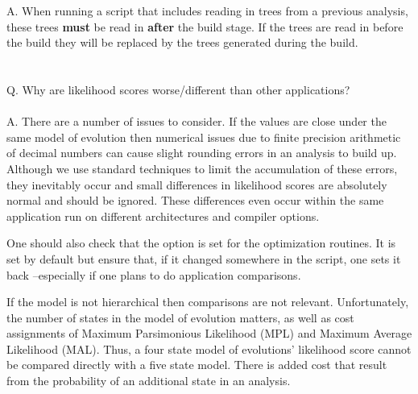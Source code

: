 A. When running a script that includes reading in trees from a previous analysis, these trees {\bf must} be read 
in {\bf after} the build stage.  If the trees are read in before the build they will be replaced by the trees 
generated during the build.\\
\\
\\
Q. Why are likelihood scores worse/different than other applications?\\
\\
A. There are a number of issues to consider. If the values are close under the same model of
evolution then numerical issues due to finite precision arithmetic of decimal numbers can cause
slight rounding errors in an analysis to build up. Although we use standard techniques to limit the
accumulation of these errors, they inevitably occur and small differences in likelihood scores are
absolutely normal and should be ignored. These differences even occur within the same application
run on different architectures and compiler options.

One should also check that the  option is set for the optimization routines.
It is set by default but ensure that, if it changed somewhere in the script, one sets it back
--especially if one plans to do application comparisons.

If the model is not hierarchical then comparisons are not relevant. Unfortunately, the number of
states in the model of evolution matters, as well as cost assignments of Maximum Parsimonious
Likelihood (MPL) and Maximum Average Likelihood (MAL). Thus, a four state model of evolutions'
likelihood score cannot be compared directly with a five state model. There is added cost that
result from the probability of an additional state in an analysis. 
\\
\\

